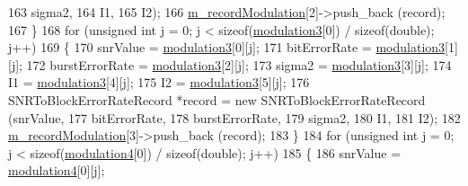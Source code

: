\begin{DoxyCode}
163                                                                          sigma2,
164                                                                          I1,
165                                                                          I2);
166       \hyperlink{classns3_1_1SNRToBlockErrorRateManager_af74c812f3b0a25252f2897aadea6898e}{m\_recordModulation}[2]->push\_back (record);
167     \}
168   \textcolor{keywordflow}{for} (\textcolor{keywordtype}{unsigned} \textcolor{keywordtype}{int} j = 0; j < \textcolor{keyword}{sizeof}(\hyperlink{classns3_1_1SNRToBlockErrorRateManager_ac3cc26ad3beab93e7e4f75686442ed00}{modulation3}[0]) / \textcolor{keyword}{sizeof}(\textcolor{keywordtype}{double}); j++)
169     \{
170       snrValue = \hyperlink{classns3_1_1SNRToBlockErrorRateManager_ac3cc26ad3beab93e7e4f75686442ed00}{modulation3}[0][j];
171       bitErrorRate = \hyperlink{classns3_1_1SNRToBlockErrorRateManager_ac3cc26ad3beab93e7e4f75686442ed00}{modulation3}[1][j];
172       burstErrorRate = \hyperlink{classns3_1_1SNRToBlockErrorRateManager_ac3cc26ad3beab93e7e4f75686442ed00}{modulation3}[2][j];
173       sigma2 = \hyperlink{classns3_1_1SNRToBlockErrorRateManager_ac3cc26ad3beab93e7e4f75686442ed00}{modulation3}[3][j];
174       I1 = \hyperlink{classns3_1_1SNRToBlockErrorRateManager_ac3cc26ad3beab93e7e4f75686442ed00}{modulation3}[4][j];
175       I2 = \hyperlink{classns3_1_1SNRToBlockErrorRateManager_ac3cc26ad3beab93e7e4f75686442ed00}{modulation3}[5][j];
176       SNRToBlockErrorRateRecord *record = \textcolor{keyword}{new} SNRToBlockErrorRateRecord (snrValue,
177                                                                          bitErrorRate,
178                                                                          burstErrorRate,
179                                                                          sigma2,
180                                                                          I1,
181                                                                          I2);
182       \hyperlink{classns3_1_1SNRToBlockErrorRateManager_af74c812f3b0a25252f2897aadea6898e}{m\_recordModulation}[3]->push\_back (record);
183     \}
184   \textcolor{keywordflow}{for} (\textcolor{keywordtype}{unsigned} \textcolor{keywordtype}{int} j = 0; j < \textcolor{keyword}{sizeof}(\hyperlink{classns3_1_1SNRToBlockErrorRateManager_af9859714760453902c7b79c22ffb2e23}{modulation4}[0]) / \textcolor{keyword}{sizeof}(\textcolor{keywordtype}{double}); j++)
185     \{
186       snrValue = \hyperlink{classns3_1_1SNRToBlockErrorRateManager_af9859714760453902c7b79c22ffb2e23}{modulation4}[0][j];

\end{DoxyCode}
